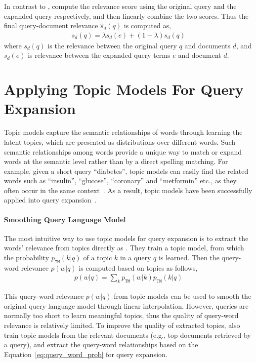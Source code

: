 In contrast to \citet{zhai-01b}, \citet{Lavrenko-2001} compute
the relevance score using the original query and the expanded query
respectively, and then linearly combine the two scores. Thus the final
query-document relevance $\hat{s}_d(q)$ is computed as,
\begin{align}
\label{eq:rm_qe_comb}
\hat{s}_d(q) = \lambda s_d(e) + (1-\lambda)s_d(q)
\end{align}
where $s_d(q)$ is the relevance between the original query $q$ and
documents $d$, and $s_d(e)$ is relevance between the expanded query
terms $e$ and document $d$.

\section{Applying Topic Models For Query Expansion}

Topic models capture the semantic relationships of words through
learning the latent topics, which are presented as distributions over
different words. Such semantic relationships among words provide a
unique way to match or expand words at the semantic level rather than
by a direct spelling matching. For example, given a short query ``diabetes'',
topic models can easily find the related words such as
``insulin'', ``glucose'', ``coronary'' and ``metformin'' etc., 
as they often occur in the same context~\citep{Zeng-2012}. 
As a result, topic models have been
successfully applied into query expansion~\citep{Yi-2009,Park-2009,Zeng-2012}.

\paragraph{Smoothing Query Language Model}

The most intuitive way to use topic models for query expansion is to
extract the words' relevance from topics directly as
\citet{Yi-2009}. They train a topic model, from which the probability
$p_{\texttt{TM}}(k|q)$ of a topic $k$ in a query $q$ is learned. Then
the query-word relevance $p(w|q)$ is computed based on topics as
follows,
\begin{align}
\label{eq:query_word_prob}
p(w|q) = \sum_k p_{\texttt{TM}}(w|k) p_{\texttt{TM}}(k|q)
\end{align}

This query-word relevance $p(w|q)$ from topic models can be used to
smooth the original query language model through linear
interpolation. However, queries are normally too short to learn
meaningful topics, thus the quality of query-word relevance is
relatively limited. To improve the quality of extracted topics,
\citet{Yi-2009} also train topic models from the relevant documents
(e.g., top documents retrieved by a query), and extract the query-word
relationships based on the Equation~\ref{eq:query_word_prob} for query
expansion.

